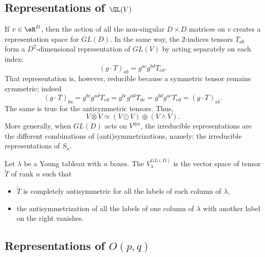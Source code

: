 					\subsection{Representations of \texorpdfstring{$\GL(V)$}{GL(V)} }

If $v\in \eR^D$, then the action of all the non-singular $D\times D$ matrices on $v$ creates a representation space for $GL(D)$. In the same way, the $2$-indices tensors $T_{ab}$ form a $D^2$-dimensional representation of $GL(V)$ by acting separately on each index:
\begin{equation}		\label{EqYoungAgitIndices}
	(g\cdot T)_{ab}=g^{ac}g^{bd}T_{cd}.
\end{equation}
That representation is, however, reducible because a symmetric tensor remains symmetric; indeed
\begin{equation}
	(g\cdot T)_{ba}=g^{bc}g^{ad}T_{cd}=g^{bc}g^{ad}T_{dc}=g^{bd}g^{ac}T_{cd}=(g\cdot T)_{ab}.
\end{equation}
The same is true for the antisymmetric tensors. Thus,
\begin{equation}
	V\otimes V\simeq (V\odot V)\oplus(V\wedge V).
\end{equation}
More generally, when $GL(D)$ acts on $V^{\otimes n}$, the irreducible representations are the different combinations of (anti)symmetrizations, namely: the irreducible representations of $S_n$.



Let $\lambda$ be a Young tableau with $n$ boxes. The  $V_{\lambda}^{GL(D)}$ is the vector space of tensor $\tilde T$ of rank $n$ such that
\begin{itemize}
	\item $\tilde T$ is completely antisymmetric for all the labels of each column of $\lambda$,
	\item the antisymmetrization of all the labels of one column of $\lambda$ with another label on the right vanishes.
\end{itemize}

					\subsection{Representations of \texorpdfstring{$O(p,q)$}{Opq}}

